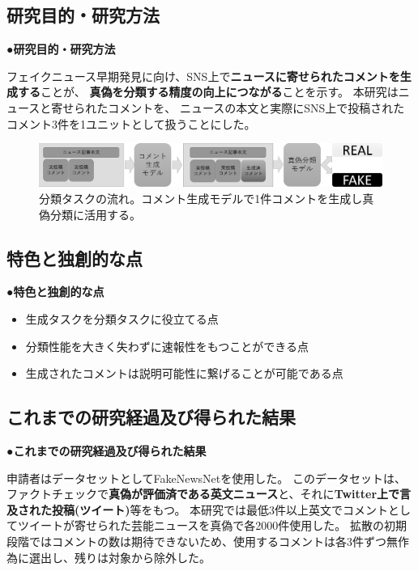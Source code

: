 {	\subsection{研究目的・研究方法}
	\noindent
	●\textbf{研究目的・研究方法}

	フェイクニュース早期発見に向け、SNS上で\textbf{ニュースに寄せられたコメントを生成する}ことが、
	\textbf{真偽を分類する精度の向上につながる}ことを示す。
	本研究はニュースと寄せられたコメントを、
	ニュースの本文と実際にSNS上で投稿されたコメント3件を1ユニットとして扱うことにした。
	
	\begin{figure}[ht]
		\centering
		\includegraphics[width=0.95\linewidth]{model.pdf}
		\caption{分類タスクの流れ。コメント生成モデルで1件コメントを生成し真偽分類に活用する。}
		\label{fig:model}
	\end{figure}

	\subsection{特色と独創的な点}
	\noindent
	●\textbf{特色と独創的な点}
	
	\begin{itemize}
		\item 生成タスクを分類タスクに役立てる点
		\item 分類性能を大きく失わずに速報性をもつことができる点
		\item 生成されたコメントは説明可能性に繋げることが可能である点
	\end{itemize}

	\subsection{これまでの研究経過及び得られた結果}
	\noindent
	●\textbf{これまでの研究経過及び得られた結果}

	申請者はデータセットとしてFakeNewsNet\cite{Shu2018FakeNewsNetAD}を使用した。
	このデータセットは、ファクトチェックで\textbf{真偽が評価済である英文ニュース}と、それに\textbf{Twitter上で言及された投稿(ツイート)}等をもつ。
	本研究では最低3件以上英文でコメントとしてツイートが寄せられた芸能ニュースを真偽で各2000件使用した。
	拡散の初期段階ではコメントの数は期待できないため、使用するコメントは各3件ずつ無作為に選出し、残りは対象から除外した。

}
